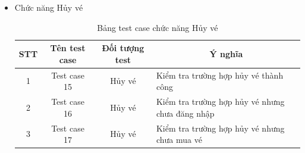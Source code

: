 \documentclass[a4paper, 12pt]{article}
\begin{document}
\begin{itemize}
	\item Chức năng Hủy vé 
	\begin{table}[H]
		\centering
		\begin{tabular}{|c|c|c|l|} 
		\hline
		STT & Tên test case & \multicolumn{1}{c|}{Đối tượng test}                                           & \multicolumn{1}{c|}{Ý nghĩa}                                                                                                       \\ 
		\hline
		1   & Test case 15  & Hủy vé                                                                        & Kiểm tra trường hợp hủy vé thành công                                                                                              \\ 
		\hline
		2  & Test case 16  & Hủy vé                                                                        & Kiểm tra trường hợp hủy vé nhưng chưa đăng nhập                                                                                    \\ 
		\hline
		3  & Test case 17  & Hủy vé                                                                        & Kiểm tra trường hợp hủy vé nhưng chưa mua vé                                                                                       \\ 
		\hline
		\end{tabular}
		\caption{Bảng test case chức năng Hủy vé }
	\end{table}


\end{itemize}
\end{document}
